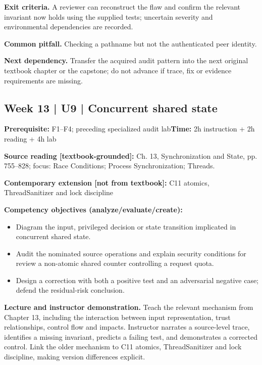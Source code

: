 \documentclass[10pt,letterpaper]{article}
\begin{document}
\textbf{Exit criteria.} A reviewer can reconstruct the flaw and confirm the relevant invariant now holds using the supplied tests; uncertain severity and environmental dependencies are recorded.

\textbf{Common pitfall.} Checking a pathname but not the authenticated peer identity.

\textbf{Next dependency.} Transfer the acquired audit pattern into the next original textbook chapter or the capstone; do not advance if trace, fix or evidence requirements are missing.

\subsection{Week 13 | U9 | Concurrent shared state}
\textbf{Prerequisite:} F1--F4; preceding specialized audit lab\hfill\textbf{Time:} 2h instruction + 2h reading + 4h lab

\textbf{Source reading [textbook-grounded]:} Ch. 13, Synchronization and State, pp. 755--828; focus: Race Conditions; Process Synchronization; Threads.

\textbf{Contemporary extension [not from textbook]:} C11 atomics, ThreadSanitizer and lock discipline

\textbf{Competency objectives (analyze/evaluate/create):}
\begin{itemize}[leftmargin=*,itemsep=2pt]
\item Diagram the input, privileged decision or state transition implicated in concurrent shared state.
\item Audit the nominated source operations and explain security conditions for review a non-atomic shared counter controlling a request quota.
\item Design a correction with both a positive test and an adversarial negative case; defend the residual-risk conclusion.
\end{itemize}
\textbf{Lecture and instructor demonstration.} Teach the relevant mechanism from Chapter 13, including the interaction between input representation, trust relationships, control flow and impacts. Instructor narrates a source-level trace, identifies a missing invariant, predicts a failing test, and demonstrates a corrected control. Link the older mechanism to C11 atomics, ThreadSanitizer and lock discipline, making version differences explicit.
\end{document}
